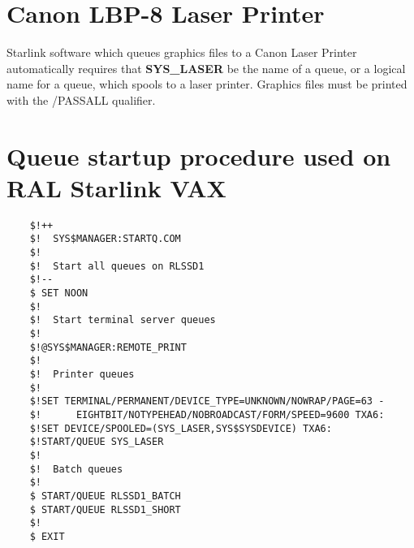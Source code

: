 \section{Canon LBP-8 Laser Printer}

Starlink software which queues graphics files to a Canon Laser Printer
automatically requires that {\bf SYS\_LASER} be the name of a queue, or a
logical name for a queue, which spools to a laser printer.
Graphics files must be printed with the /PASSALL qualifier.

\appendix

\section{Queue startup procedure used on RAL Starlink VAX}

\begin{verbatim}
    $!++
    $!  SYS$MANAGER:STARTQ.COM
    $!
    $!  Start all queues on RLSSD1
    $!--
    $ SET NOON
    $!
    $!  Start terminal server queues
    $!
    $!@SYS$MANAGER:REMOTE_PRINT
    $!
    $!  Printer queues
    $!
    $!SET TERMINAL/PERMANENT/DEVICE_TYPE=UNKNOWN/NOWRAP/PAGE=63 -
    $!		EIGHTBIT/NOTYPEHEAD/NOBROADCAST/FORM/SPEED=9600	TXA6:
    $!SET DEVICE/SPOOLED=(SYS_LASER,SYS$SYSDEVICE) TXA6:
    $!START/QUEUE SYS_LASER
    $!
    $!  Batch queues
    $!
    $ START/QUEUE RLSSD1_BATCH
    $ START/QUEUE RLSSD1_SHORT
    $!
    $ EXIT
\end{verbatim}

